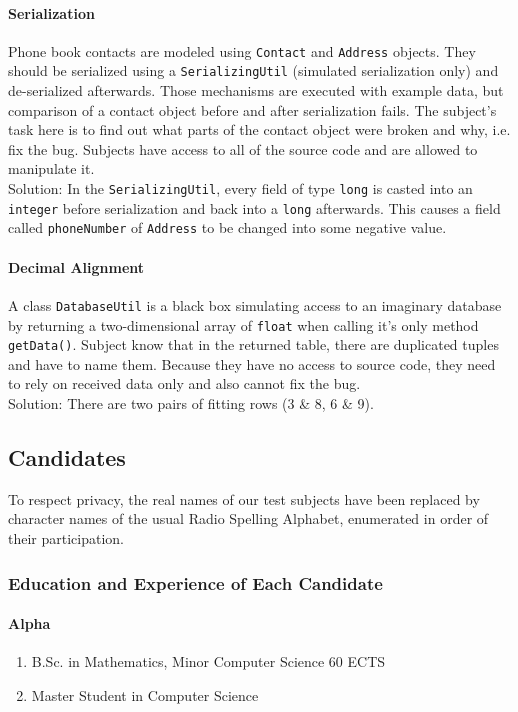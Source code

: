 \documentclass[english]{acm_proc_article-sp}
\begin{document}
\paragraph{Serialization}
Phone book contacts are modeled using \verb.Contact. and \verb.Address. objects. They should be serialized using a \verb.SerializingUtil. (simulated serialization only) and de-serialized afterwards.
Those mechanisms are executed with example data, but comparison of a contact object before and after serialization fails. The subject's task here is to find out what parts of the contact object were broken and why, i.e. fix the bug. Subjects have access to all of the source code and are allowed to manipulate it.\\
Solution: In the \verb.SerializingUtil., every field of type \verb.long. is casted into an \verb.integer. before serialization and back into a \verb.long. afterwards. This causes a field called \verb.phoneNumber. of \verb.Address. to be changed into some negative value.

\paragraph{Decimal Alignment}
A class \verb.DatabaseUtil. is a black box simulating access to an imaginary database by returning a two-dimensional array of \verb.float. when calling it's only method \verb.getData().. Subject know that in the returned table, there are duplicated tuples and have to name them. Because they have no access to source code, they need to rely on received data only and also cannot fix the bug.\\
Solution: There are two pairs of fitting rows (3 \& 8, 6 \& 9).

\subsection{Candidates}
To respect privacy, the real names of our test subjects have been replaced by character names of the usual Radio Spelling Alphabet, enumerated in order of their participation.

\subsubsection{Education and Experience of Each Candidate}
\paragraph{Alpha} %
\begin{enumerate}[$-$]
\item B.Sc. in Mathematics, Minor Computer Science 60 ECTS
\item Master Student in Computer Science
\end{enumerate}
\end{document}
